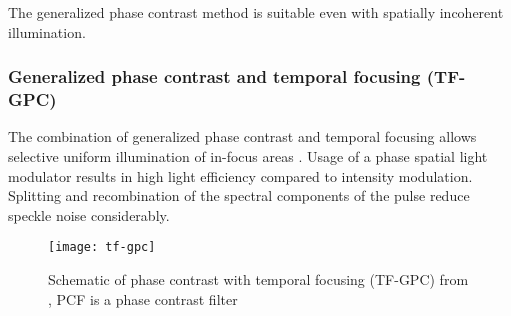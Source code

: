 The generalized phase contrast method is suitable even with spatially
incoherent illumination.
\subsubsection{Generalized phase contrast and temporal focusing (TF-GPC)}
The combination of generalized phase contrast and temporal focusing
allows selective uniform illumination of in-focus areas
\citep{Papagiakoumou2010}. Usage of a phase spatial light modulator
results in high light efficiency compared to intensity modulation.
Splitting and recombination of the spectral components of the pulse
reduce speckle noise considerably.
\begin{figure}[!hbt]
  \centering
  \texttt{[image: tf-gpc]} 
  \caption{Schematic of phase contrast with temporal focusing (TF-GPC)
    from \citep{Papagiakoumou2010}, PCF is a phase contrast filter}
  \label{fig:tf-gpc}
\end{figure}
